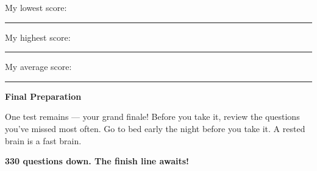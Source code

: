 {\begin{tcolorbox}[
    enhanced,
    colback=funPurpleLight,
    colframe=funPurple!50,
    arc=10pt,
    boxrule=1.5pt,
    left=6mm, right=6mm, top=5mm, bottom=5mm,
]
\vspace{2mm}

\faArrowRight\hspace{2mm}My lowest score: \rule[-2pt]{1cm}{0.5pt}\hspace{6mm}My highest score: \rule[-2pt]{1cm}{0.5pt}

\vspace{2mm}

\faArrowRight\hspace{2mm}My average score: \rule[-2pt]{2cm}{0.5pt}
\end{tcolorbox}

\vspace{3mm}

\begin{tcolorbox}[
    enhanced,
    colback=funYellowLight,
    colframe=funYellow!60,
    arc=10pt,
    boxrule=1pt,
    left=6mm, right=6mm, top=4mm, bottom=4mm,
]
{\bfseries\color{funYellowDark} \faLightbulb\hspace{2mm}Final Preparation}

\vspace{2mm}

One test remains — your grand finale! Before you take it, review the questions you've missed most often. Go to bed early the night before you take it. A rested brain is a fast brain.
\end{tcolorbox}

\vspace{4mm}

\begin{center}
{\large\bfseries\color{funPurpleDark} \faMedal\hspace{2mm}330 questions down. The finish line awaits!\hspace{2mm}\faMedal}
\end{center}

}
\newpage
